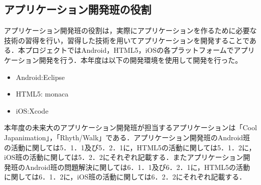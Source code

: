 \subsection{アプリケーション開発班の役割}
\par
アプリケーション開発班の役割は，実際にアプリケーションを作るために必要な技術の習得を行い，習得した技術を用いてアプリケーションを開発することである．本プロジェクトではAndroid，HTML5，iOSの各プラットフォームでアプリケーション開発を行う．本年度は以下の開発環境を使用して開発を行った。

\begin{itemize}
\item Android:Eclipse
\item HTML5: monaca
\item iOS:Xcode
\end{itemize}

\par 本年度の未来大のアプリケーション開発班が担当するアプリケーションは「Cool Japanimation」，「Rhyth/Walk」である．アプリケーション開発班のAndroid班の活動に関しては5．1．1及び5．2．1に，HTML5の活動に関しては5．1．2に，iOS班の活動に関しては5．2．2にそれぞれ記載する．またアプリケーション開発班のAndroid班の問題解決に関しては6．1．1及び6．2．1に，HTML5の活動に関しては6．1．2に，iOS班の活動に関しては6．2．2にそれぞれ記載する．

